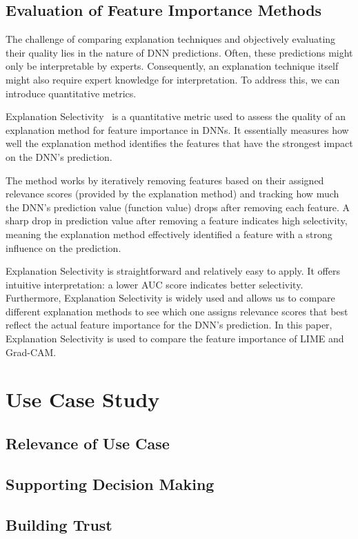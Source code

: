 \documentclass{article}
\begin{document}
\subsection{Evaluation of Feature Importance Methods}
The challenge of comparing explanation techniques and objectively evaluating their quality lies in the nature of DNN predictions. Often, these predictions might only be interpretable by experts. Consequently, an explanation technique itself might also require expert knowledge for interpretation. To address this, we can introduce quantitative metrics.

Explanation Selectivity~\cite{MONTAVON20181} is a quantitative metric used to assess the quality of an explanation method for feature importance in DNNs. It essentially measures how well the explanation method identifies the features that have the strongest impact on the DNN's prediction.

The method works by iteratively removing features based on their assigned relevance scores (provided by the explanation method) and tracking how much the DNN's prediction value (function value) drops after removing each feature. A sharp drop in prediction value after removing a feature indicates high selectivity, meaning the explanation method effectively identified a feature with a strong influence on the prediction.

Explanation Selectivity is straightforward and relatively easy to apply. It offers intuitive interpretation: a lower AUC score indicates better selectivity. Furthermore, Explanation Selectivity is widely used and allows us to compare different explanation methods to see which one assigns relevance scores that best reflect the actual feature importance for the DNN's prediction. In this paper, Explanation Selectivity is used to compare the feature importance of LIME and Grad-CAM.


\section{Use Case Study}
\subsection{Relevance of Use Case}
\subsection{Supporting Decision Making}
\subsection{Building Trust}
\end{document}

